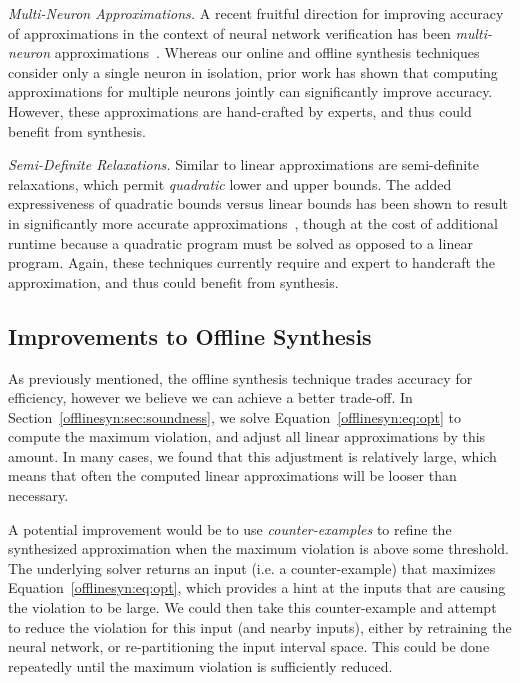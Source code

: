 \textit{Multi-Neuron Approximations.} A recent fruitful direction for
improving accuracy of approximations in the context of neural network
verification has been \textit{multi-neuron}
approximations~\cite{Singh2019krelu,muller2021prima}. Whereas our online
and offline synthesis techniques consider only a single neuron in
isolation, prior work has shown that computing approximations for multiple
neurons jointly can significantly improve accuracy. However, these
approximations are hand-crafted by experts, and thus could benefit from
synthesis.

\textit{Semi-Definite Relaxations.} Similar to linear approximations are
semi-definite relaxations, which permit \textit{quadratic} lower and upper
bounds. The added expressiveness of quadratic bounds versus linear bounds
has been shown to result in significantly more accurate
approximations~\cite{dathathri2020enabling}, though at the cost of
additional runtime because a quadratic program must be solved as opposed to
a linear program. Again, these techniques currently require and expert to
handcraft the approximation, and thus could benefit from synthesis.


\subsection{Improvements to Offline Synthesis}
As previously mentioned, the offline synthesis technique trades accuracy
for efficiency, however we believe we can achieve a better trade-off. In
Section~\ref{offlinesyn:sec:soundness}, we solve
Equation~\ref{offlinesyn:eq:opt} to compute the maximum violation, and
adjust all linear approximations by this amount. In many cases, we found
that this adjustment is relatively large, which means that often the
computed linear approximations will be looser than necessary.

A potential improvement would be to use \textit{counter-examples} to refine
the synthesized approximation when the maximum violation is above some
threshold. The underlying solver returns an input (i.e. a counter-example) that
maximizes Equation~\ref{offlinesyn:eq:opt}, which provides a
hint at the inputs that are causing the violation to be large. We could
then take this counter-example and attempt to reduce the violation for this
input (and nearby inputs), either by retraining the neural network, or
re-partitioning the input interval space. This could be done repeatedly
until the maximum violation is sufficiently reduced.